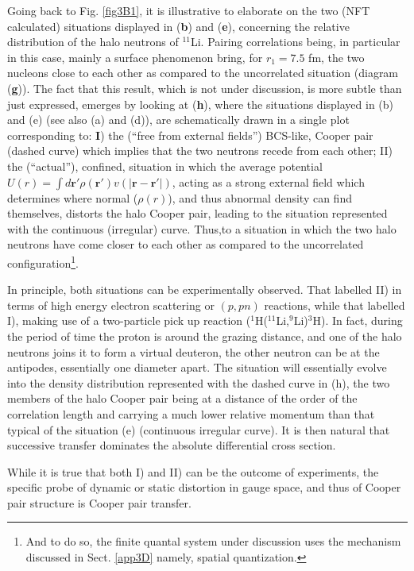 Going back to Fig. \ref{fig3B1}, it is illustrative to elaborate on the two (NFT calculated) situations displayed in (\textbf{b}) and (\textbf{e}), concerning the relative distribution of the halo neutrons of $^{11}$Li. Pairing correlations being, in particular in this case, mainly a surface phenomenon bring, for $r_1=7.5$ fm, the two nucleons close to each other as compared to the uncorrelated situation (diagram (\textbf{g})). The fact that this result, which is not under discussion, is more subtle than just expressed, emerges by looking at (\textbf{h}), where the situations displayed in (b) and (e) (see also (a) and (d)), are schematically drawn in a single plot corresponding to: \textbf{I}) the (``free from external fields'') BCS-like, Cooper pair  (dashed curve) which implies that the two neutrons recede from each other; II) the (``actual''), confined, situation in which the average potential $U(r)=\int  d\mathbf r' \rho(\mathbf r')v(|\mathbf r-\mathbf r'|)$, acting as a strong external field which determines where normal ($\rho(r)$), and thus abnormal density can find themselves, distorts the halo Cooper pair, leading to the situation represented with the continuous (irregular) curve. Thus,to a situation in which the two halo neutrons have come closer to each other as compared to the uncorrelated configuration\footnote{And to do so, the finite quantal system under discussion uses the mechanism discussed in Sect. \ref{app3D} namely, spatial quantization.}. 


In principle, both situations can be experimentally observed. That labelled II) in terms of high energy electron scattering or $(p,pn)$ reactions, while that labelled I),  making use of a two-particle pick up reaction ($^1$H($^{11}$Li,$^9$Li)$^3$H). In fact, during the period of time the proton is around the grazing distance, and one of the halo neutrons joins it to form a virtual deuteron, the other neutron can be at the antipodes, essentially one diameter apart. The situation will essentially evolve into the density distribution represented with the dashed curve in (h), the two members of the halo Cooper pair being at a distance of the order of the correlation length and carrying a much lower relative momentum than that typical of the situation (e) (continuous irregular curve). It is then natural that successive transfer dominates the absolute differential cross section.

While it is true that both I) and II) can be the outcome of experiments, the specific probe of dynamic or static distortion in gauge space, and thus of Cooper pair structure is Cooper pair transfer.


